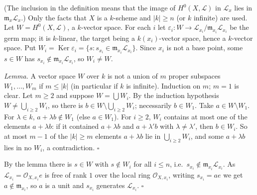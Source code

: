 \documentclass[11pt]{article}
\begin{document}
\pf
(The inclusion in the definition means that the image of $H^0(X,\mathcal{L})$ in $\mathcal{L}_x$ lies in $\mathfrak{m}_x\mathcal{L}_x$.) Only the facts that $X$ is a $k$-scheme and $|k|\ge n$ (or $k$ infinite) are used. Let $W=H^0(X,\mathcal{L})$, a $k$-vector space. For each $i$ let $\varepsilon_i:W\to\mathcal{L}_{x_i}/\mathfrak{m}_{x_i}\mathcal{L}_{x_i}$ be the germ map; it is $k$-linear, the target being a $k(x_i)$-vector space, hence a $k$-vector space. Put $W_i=\operatorname{Ker}\varepsilon_i=\{s: s_{x_i}\in\mathfrak{m}_{x_i}\mathcal{L}_{x_i}\}$. Since $x_i$ is not a base point, some $s\in W$ has $s_{x_i}\notin\mathfrak{m}_{x_i}\mathcal{L}_{x_i}$, so $W_i\ne W$.

\emph{Lemma.} A vector space $W$ over $k$ is not a union of $m$ proper subspaces $W_1,\dots,W_m$ if $m\le|k|$ (in particular if $k$ is infinite). Induction on $m$; $m=1$ is clear. Let $m\ge2$ and suppose $W=\bigcup W_i$. By the induction hypothesis $W\ne\bigcup_{i\ge2}W_i$, so there is $b\in W\setminus\bigcup_{i\ge2}W_i$; necessarily $b\in W_1$. Take $a\in W\setminus W_1$. For $\lambda\in k$, $a+\lambda b\notin W_1$ (else $a\in W_1$). For $i\ge2$, $W_i$ contains at most one of the elements $a+\lambda b$: if it contained $a+\lambda b$ and $a+\lambda'b$ with $\lambda\ne\lambda'$, then $b\in W_i$. So at most $m-1$ of the $|k|\ge m$ elements $a+\lambda b$ lie in $\bigcup_{i\ge2}W_i$, and some $a+\lambda b$ lies in no $W_i$, a contradiction. $\square$

By the lemma there is $s\in W$ with $s\notin W_i$ for all $i\le n$, i.e.\ $s_{x_i}\notin\mathfrak{m}_{x_i}\mathcal{L}_{x_i}$. As $\mathcal{L}_{x_i}=\mathcal{O}_{X,x_i}e$ is free of rank $1$ over the local ring $\mathcal{O}_{X,x_i}$, writing $s_{x_i}=ae$ we get $a\notin\mathfrak{m}_{x_i}$, so $a$ is a unit and $s_{x_i}$ generates $\mathcal{L}_{x_i}$. \hfill$\square$
\end{document}
